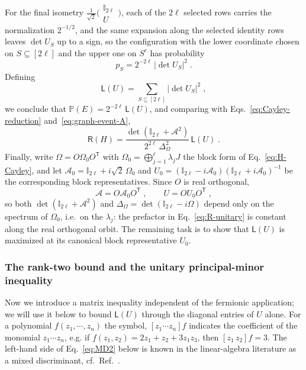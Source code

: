 \documentclass[prx,twocolumn,superscriptaddress,aps,10pt, frontmatterverbose, reprint,footinbib,longbibliography=true]{revtex4-2}
\newcommand{\trans}{\mathsf{T}}
\providecommand{\DIFaddtex}[1]{{\protect\color{red}\uwave{#1}}} %
\providecommand{\DIFdeltex}[1]{{\protect\color{red}\sout{#1}}}                      %
\providecommand{\DIFaddbegin}{\protect\color{red}} %
\providecommand{\DIFaddend}{\protect\color{black}} %
\providecommand{\DIFdelbegin}{} %
\providecommand{\DIFdelend}{} %
\providecommand{\DIFadd}[1]{\texorpdfstring{\DIFaddtex{#1}}{#1}} %
\providecommand{\DIFdel}[1]{\texorpdfstring{\DIFdeltex{#1}}{}} %
\newcommand{\DIFscaledelfig}{0.5}
\newlength{\DIFdelgraphicswidth} %
\newlength{\DIFdelgraphicsheight} %
\newcommand{\DIFaddincludegraphics}[2][]{{\color{blue}\fbox{\DIFOincludegraphics[#1]{#2}}}} %
\newcommand{\DIFdelincludegraphics}[2][]{%
\sbox{\DIFdelgraphicsbox}{\DIFOincludegraphics[#1]{#2}}%
\settoboxwidth{\DIFdelgraphicswidth}{\DIFdelgraphicsbox} %
\settoboxtotalheight{\DIFdelgraphicsheight}{\DIFdelgraphicsbox} %
\scalebox{\DIFscaledelfig}{%
\parbox[b]{\DIFdelgraphicswidth}{\usebox{\DIFdelgraphicsbox}\\[-\baselineskip] \rule{\DIFdelgraphicswidth}{0em}}\llap{\resizebox{\DIFdelgraphicswidth}{\DIFdelgraphicsheight}{%
\setlength{\unitlength}{\DIFdelgraphicswidth}%
\begin{picture}(1,1)%
\thicklines\linethickness{2pt} %
{\color[rgb]{1,0,0}\put(0,0){\framebox(1,1){}}}%
{\color[rgb]{1,0,0}\put(0,0){\line( 1,1){1}}}%
{\color[rgb]{1,0,0}\put(0,1){\line(1,-1){1}}}%
\end{picture}%
}\hspace*{3pt}}} %
} %
\DeclareRobustCommand{\DIFaddbegin}{\DIFOaddbegin \let\includegraphics\DIFaddincludegraphics} %
\DeclareRobustCommand{\DIFaddend}{\DIFOaddend \let\includegraphics\DIFOincludegraphics} %
\DeclareRobustCommand{\DIFdelbegin}{\DIFOdelbegin \let\includegraphics\DIFdelincludegraphics} %
\DeclareRobustCommand{\DIFdelend}{\DIFOaddend \let\includegraphics\DIFOincludegraphics} %
\begin{document}
For the final isometry $\frac{1}{\sqrt2}\big(\begin{smallmatrix}\mathbb{I}_{2\ell}\\ U\end{smallmatrix}\big)$, each of the $2\ell$ selected rows carries the normalization $2^{-1/2}$, and the same expansion along the selected identity rows leaves $\det U_S$ up to a sign, so the configuration with the lower coordinate chosen on $S\subseteq[2\ell]$ and the upper one on $S^c$ has probability
\begin{equation}
    p_S=2^{-2\ell}\,|\det U_S|^2\;.
\end{equation}
Defining
\begin{equation}
    \mathsf{L}(U)=\sum_{S\subseteq[2\ell]}|\det U_S|^2\;,
    \label{eq:L-definition}
    \end{equation}
we conclude that $\mathbb{P}(E)=2^{-2\ell}\,\mathsf{L}(U)$, and comparing with Eqs.~\eqref{eq:Cayley-reduction} and~\eqref{eq:graph-event-A},
\begin{equation}
    \mathsf{R}(H)=\frac{\det(\mathbb{I}_{2\ell}+\mathcal{A}^2)}{2^{2\ell}\,\Delta_\Omega^2}\,\mathsf{L}(U)\;.
    \label{eq:R-unitary}
\end{equation}
Finally, write $\Omega=O\Omega_0O^{\trans}$ with $\Omega_0=\bigoplus_{j=1}^{\ell}\lambda_jJ$ the block form of Eq.~\eqref{eq:H-Cayley}, and let $\mathcal{A}_0=\mathbb{I}_{2\ell}+i\sqrt2\,\Omega_0$ and $U_0=(\mathbb{I}_{2\ell}-i\mathcal{A}_0)(\mathbb{I}_{2\ell}+i\mathcal{A}_0)^{-1}$ be the corresponding block representatives. Since $O$ is real orthogonal,
\begin{equation}
    \mathcal{A}=O\mathcal{A}_0O^{\trans}\;,\qquad U=OU_0O^{\trans}\;,
\end{equation}
so both $\det(\mathbb{I}_{2\ell}+\mathcal{A}^2)$ and $\Delta_\Omega=\det(\mathbb{I}_{2\ell}-i\Omega)$ depend only on the spectrum of $\Omega_0$, i.e.\ on the $\lambda_j$: the prefactor in Eq.~\eqref{eq:R-unitary} is constant along the real orthogonal orbit. The remaining task is to show that $\mathsf{L}(U)$ is maximized at its canonical block representative $U_0$.

\subsubsection{ The rank-two bound and the unitary principal-minor inequality}
\label{app:proof:MD2}

Now we introduce a matrix inequality independent of the fermionic application; we will use it below to bound $\mathsf{L}(U)$ through the diagonal entries of $U$ alone. 
For a polynomial $f(z_1, \cdots,z_n)$ the symbol, $[z_1\cdots z_n]f$ indicates the coefficient of the monomial $z_1\cdots z_n$, e.g. if \DIFdelbegin \DIFdel{$f(z_1,z_2)=2z_1+z_2+3 z_1z_3$}\DIFdelend \DIFaddbegin \DIFadd{$f(z_1,z_2)=2z_1+z_2+3 z_1z_2$}\DIFaddend , then $[z_1 \, z_2]f=3$.
The left-hand side of Eq.~\eqref{eq:MD2} below is known in the linear-algebra literature as a mixed discriminant, cf.\ Ref.~\cite{Bapat1989}.
\end{document}
